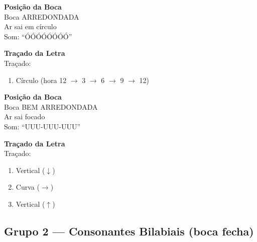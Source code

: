 \vspace{1em}

\begin{boquinha}
\begin{minipage}{0.45\textwidth}
\centering
\textbf{Posição da Boca}\\[0.5em]
Boca ARREDONDADA\\
Ar sai em círculo\\
Som: ``ÓÓÓÓÓÓÓÓ''
\end{minipage}
\hfill
\begin{minipage}{0.45\textwidth}
\centering
\textbf{Traçado da Letra}\\[0.5em]
Traçado:
\begin{enumerate}
  \item Círculo (hora 12 $\rightarrow$ 3 $\rightarrow$ 6 $\rightarrow$ 9 $\rightarrow$ 12)
\end{enumerate}
\end{minipage}
\end{boquinha}

\vspace{1em}

\begin{boquinha}
\begin{minipage}{0.45\textwidth}
\centering
\textbf{Posição da Boca}\\[0.5em]
Boca BEM ARREDONDADA\\
Ar sai focado\\
Som: ``UUU-UUU-UUU''
\end{minipage}
\hfill
\begin{minipage}{0.45\textwidth}
\centering
\textbf{Traçado da Letra}\\[0.5em]
Traçado:
\begin{enumerate}
  \item Vertical ($\downarrow$)
  \item Curva ($\rightarrow$)
  \item Vertical ($\uparrow$)
\end{enumerate}
\end{minipage}
\end{boquinha}

\subsection{Grupo 2 --- Consonantes Bilabiais (boca fecha)}


